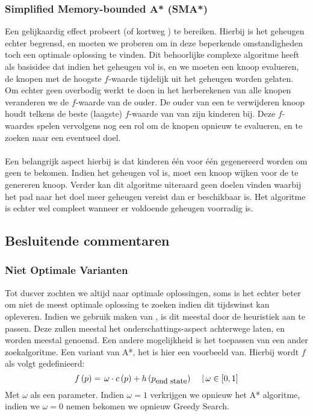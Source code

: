 \subsubsection{Simplified Memory-bounded A* (SMA*)}
Een gelijkaardig effect probeert  (of kortweg ) te bereiken. Hierbij is het geheugen echter begrensd, en moeten we proberen om in deze beperkende omstandigheden toch een optimale oplossing te vinden. Dit behoorlijke complexe algoritme heeft als basisidee dat indien het geheugen vol is, en we moeten een knoop evalueren, de knopen met de hoogste $f$-waarde tijdelijk uit het geheugen worden gelaten. Om echter geen overbodig werkt te doen in het herberekenen van alle knopen veranderen we de $f$-waarde van de ouder. De ouder van een te verwijderen knoop houdt telkens de beste (laagste) $f$-waarde van van zijn kinderen bij. Deze $f$-waardes spelen vervolgens nog een rol om de knopen opnieuw te evalueren, en te zoeken naar een eventueel doel.
\paragraph{}Een belangrijk aspect hierbij is dat kinderen \'e\'en voor \'e\'en gegenereerd worden om geen  te bekomen. Indien het geheugen vol is, moet een knoop wijken voor de te genereren knoop. Verder kan dit algoritme uiteraard geen doelen vinden waarbij het pad naar het doel meer geheugen vereist dan er beschikbaar is. Het algoritme is echter wel compleet wanneer er voldoende geheugen voorradig is.
\subsection{Besluitende commentaren}
\subsubsection{Niet Optimale Varianten}
Tot dusver zochten we altijd naar optimale oplossingen, soms is het echter beter om niet de meest optimale oplossing te zoeken indien dit tijdswinst kan opleveren. Indien we gebruik maken van , is dit meestal door de heuristiek aan te passen. Deze zullen meestal het onderschattings-aspect achterwege laten, en worden meestal  genoemd. Een andere mogelijkheid is het toepassen van een ander zoekalgoritme. Een variant van A*, het  is hier een voorbeeld van. Hierbij wordt $f$ als volgt gedefinieerd:
\begin{equation}
f\left(p\right)=\left.\omega\cdot c\left(p\right)+h\left(p_{\mbox{\small{end state}}}\right)\ \ \ \ \right|\omega\in\left[0,1\right]
\end{equation}
Met $\omega$ als een parameter. Indien $\omega=1$ verkrijgen we opnieuw het A* algoritme, indien we $\omega=0$ nemen bekomen we opnieuw Greedy Search.
